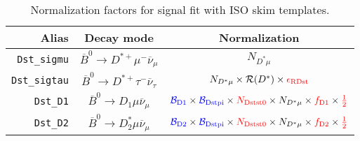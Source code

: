 \begin{landscape}
\begin{table}
\centering
\caption{
    Normalization factors for \Dstar signal fit with ISO skim templates.
}
\label{tab:fit-norm-fact-dst}
\scriptsize

\begin{tabular}{r|c|c}
\toprule
        \textbf{Alias} &                                \textbf{Decay mode}                                &                                                                                                                                                                               \textbf{Normalization}                                                                                                                                                                               \\
\midrule
   \texttt{Dst\_sigmu} &           $\overline{B}^0 \rightarrow D^{*+} \mu^- \overline{\nu}_\mu$            &                                                                                                                                                                                   $N_{D^* \mu}$                                                                                                                                                                                    \\
  \texttt{Dst\_sigtau} &          $\overline{B}^0 \rightarrow D^{*+} \tau^- \overline{\nu}_\tau$           &                                                                                                                                                 $N_{D^* \mu} \times \mathcal{R}(D^*) \times \textcolor{red}{\epsilon_\text{RDst}}$                                                                                                                                                 \\
      \texttt{Dst\_D1} &              $\overline{B}^0 \rightarrow D_1 \mu \overline{\nu}_\mu$              &                                                                           $\textcolor{blue}{\mathcal{B}_\text{D1}} \times \textcolor{blue}{\mathcal{B}_\text{Dstpi}} \times \textcolor{red}{N_\text{Dstst0}} \times N_{D^* \mu} \times \textcolor{red}{f_\text{D1}} \times \textcolor{red}{\frac{1}{2}}$                                                                           \\
      \texttt{Dst\_D2} &             $\overline{B}^0 \rightarrow D^*_2 \mu \overline{\nu}_\mu$             &                                                                           $\textcolor{blue}{\mathcal{B}_\text{D2}} \times \textcolor{blue}{\mathcal{B}_\text{Dstpi}} \times \textcolor{red}{N_\text{Dstst0}} \times N_{D^* \mu} \times \textcolor{red}{f_\text{D2}} \times \textcolor{red}{\frac{1}{2}}$                                                                           \\

\end{tabular}
\end{table}
\end{landscape}
